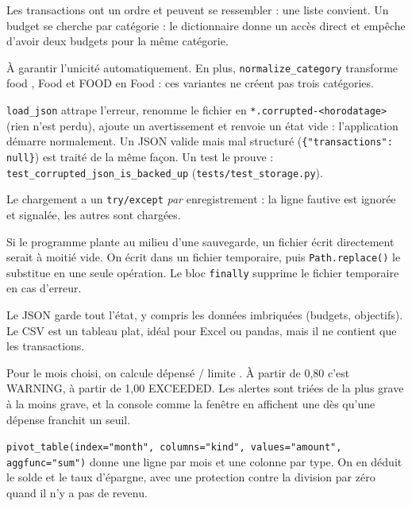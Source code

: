 \documentclass[11pt,a4paper]{article}
\newcommand{\code}[1]{{\NoAutoSpacing\texttt{#1}}}
\begin{document}
Les transactions ont un ordre et peuvent se ressembler : une liste convient. Un budget se
cherche par catégorie : le dictionnaire donne un accès direct et empêche d'avoir deux budgets
pour la même catégorie.

À garantir l'unicité automatiquement. En plus, \code{normalize\_category} transforme
\og food \fg, \og Food \fg{} et \og FOOD \fg{} en \og Food \fg : ces variantes ne créent pas
trois catégories.

\code{load\_json} attrape l'erreur, renomme le fichier en \code{*.corrupted-<horodatage>} (rien
n'est perdu), ajoute un avertissement et renvoie un état vide : l'application démarre
normalement. Un JSON valide mais mal structuré (\code{\{"transactions": null\}}) est traité de
la même façon. Un test le prouve :\\ \code{test\_corrupted\_json\_is\_backed\_up}
(\code{tests/test\_storage.py}).

Le chargement a un \code{try/except} \emph{par} enregistrement : la ligne fautive est ignorée et
signalée, les autres sont chargées.

Si le programme plante au milieu d'une sauvegarde, un fichier écrit directement serait à moitié
vide. On écrit dans un fichier temporaire, puis \code{Path.replace()} le substitue en une seule
opération. Le bloc \code{finally} supprime le fichier temporaire en cas d'erreur.

Le JSON garde tout l'état, y compris les données imbriquées (budgets, objectifs). Le CSV est un
tableau plat, idéal pour Excel ou pandas, mais il ne contient que les transactions.

Pour le mois choisi, on calcule \og dépensé / limite \fg. À partir de 0,80 c'est WARNING, à
partir de 1,00 EXCEEDED. Les alertes sont triées de la plus grave à la moins grave, et la
console comme la fenêtre en affichent une dès qu'une dépense franchit un seuil.

\code{pivot\_table(index="month", columns="kind", values="amount", aggfunc="sum")} donne une
ligne par mois et une colonne par type. On en déduit le solde et le taux d'épargne, avec une
protection contre la division par zéro quand il n'y a pas de revenu.
\end{document}
